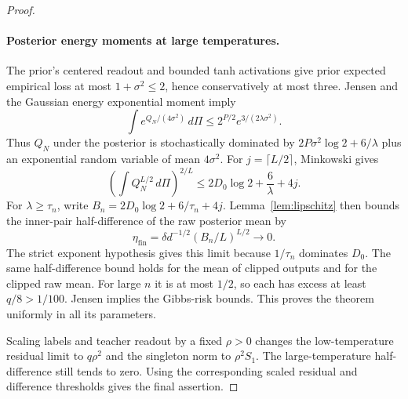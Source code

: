 \begin{proof}
\paragraph{Posterior energy moments at large temperatures.}
The prior's centered readout and bounded tanh activations give prior expected empirical loss at most $1+\sigma^2\le2$, hence conservatively at most three. Jensen and the Gaussian energy exponential moment imply
\[
 \int e^{Q_N/(4\sigma^2)}\,d\Pi
     \le2^{P/2}e^{3/(2\lambda\sigma^2)}.
\]
Thus $Q_N$ under the posterior is stochastically dominated by
$2P\sigma^2\log2+6/\lambda$ plus an exponential random variable of mean $4\sigma^2$. For $j=\lceil L/2\rceil$, Minkowski gives
\[
 \left(\int Q_N^{L/2}\,d\Pi\right)^{2/L}
    \le2D_0\log2+\frac6\lambda+4j.
\]
For $\lambda\ge\tau_n$, write $B_n=2D_0\log2+6/\tau_n+4j$. Lemma~\ref{lem:lipschitz} then bounds the inner-pair half-difference of the raw posterior mean by
\[
 \eta_{\mathrm{fin}}=\delta d^{-1/2}(B_n/L)^{L/2}\longrightarrow0.
\]
The strict exponent hypothesis gives this limit because $1/\tau_n$ dominates $D_0$. The same half-difference bound holds for the mean of clipped outputs and for the clipped raw mean. For large $n$ it is at most $1/2$, so each has excess at least $q/8>1/100$. Jensen implies the Gibbs-risk bounds. This proves the theorem uniformly in all its parameters.

Scaling labels and teacher readout by a fixed $\rho>0$ changes the low-temperature residual limit to $q\rho^2$ and the singleton norm to $\rho^2S_1$. The large-temperature half-difference still tends to zero. Using the corresponding scaled residual and difference thresholds gives the final assertion.
\end{proof}
